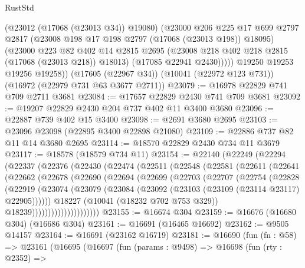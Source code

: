 \begin{lexlean}{RustStd}
\begin{coremodule}
            (@23012 (@17068 (@23013 @34)) @19080)
            (@23000
              @206
              @225
              @17
              @699
              @2797
              @2817
              (@23008 @198 @17 @198 @2797 (@17068 (@23013 @198)) @18095)
              (@23000
                @223
                @82
                @402
                @14
                @2815
                @2695
                (@23008 @218 @402 @218 @2815 (@17068 (@23013 @218)) @18013)
                (@17085 @22941 @2430)))))
        @19250
        @19253
        @19256
        @19258))
    (@17605 (@22967 @34))
    (@10041 (@22972 @123 @731))
    (@16972 (@22979 @731 @63 @3677 @2711))
@23079 := @16978 @22829 @741 @709 @2711 @3681
@23084 := @17657 @22829 @2430 @741 @709 @3681
@23092 := @19207 @22829 @2430 @204 @737 @402 @11 @3400 @3680
@23096 := @22887 @739 @402 @15 @3400
@23098 := @2691 @3680 @2695
@23103 := @23096 @23098 (@22895 @3400 @22898 @21080)
@23109 := @22886 @737 @82 @11 @14 @3680 @2695
@23114 := @18570 @22829 @2430 @734 @11 @3679
@23117 := @18578 (@18579 @734 @11)
@23154 := @22140
    (@22249
      (@22294
        (@22337
          (@22376
            (@22430
              (@22474
                (@22511
                  (@22548
                    (@22581
                      (@22611
                        (@22641
                          (@22662
                            (@22678
                              (@22690
                                (@22694
                                  (@22699
                                    (@22703
                                      (@22707
                                        (@22754
                                          (@22828
                                            (@22919
                                              (@23074
                                                (@23079
                                                  (@23084
                                                    (@23092
                                                      (@23103 (@23109 (@23114 @23117) @22905))))))
                                              @18227
                                              (@10041 (@18232 @702 @753 @329))
                                              @18239)))))))))))))))))))))
@23155 := @16674 @304
@23159 := @16676 (@16680 @304) (@16686 @304)
@23161 := @16691 (@16465 @16692)
@23162 := @9505 @14157
@23164 := @16691 (@23162 @16719)
@23181 := @16690
    (fun (fn : @58) =>
    @23161
      (@16695
        (@16697
          (fun (params : @9498) =>
          @16698
            (fun (rty : @2352) =>

\end{coremodule}
\end{lexlean}
